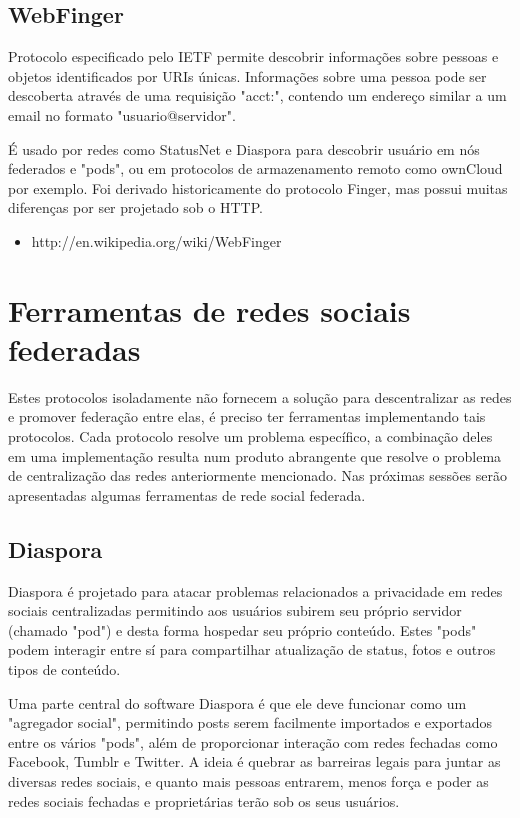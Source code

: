 \documentclass[12pt]{article}
\begin{document}
\subsection{WebFinger}

Protocolo especificado pelo IETF permite descobrir informações sobre pessoas e
objetos identificados por URIs únicas. Informações sobre uma pessoa pode ser
descoberta através de uma requisição "acct:", contendo um endereço similar a
um email no formato "usuario@servidor".

É usado por redes como StatusNet e Diaspora para descobrir usuário em nós
federados e "pods", ou em protocolos de armazenamento remoto como ownCloud por
exemplo. Foi derivado historicamente do protocolo Finger, mas possui muitas
diferenças por ser projetado sob o HTTP.

\begin{itemize}
  \item http://en.wikipedia.org/wiki/WebFinger
\end{itemize}

\section{Ferramentas de redes sociais federadas}

Estes protocolos isoladamente não fornecem a solução para descentralizar as
redes e promover federação entre elas, é preciso ter ferramentas implementando
tais protocolos. Cada protocolo resolve um problema específico, a combinação
deles em uma implementação resulta num produto abrangente que resolve o
problema de centralização das redes anteriormente mencionado. Nas próximas
sessões serão apresentadas algumas ferramentas de rede social federada.

\subsection{Diaspora}

Diaspora é projetado para atacar problemas relacionados a privacidade em redes
sociais centralizadas permitindo aos usuários subirem seu próprio servidor
(chamado "pod") e desta forma hospedar seu próprio conteúdo. Estes "pods" podem
interagir entre sí para compartilhar atualização de status, fotos e outros tipos de
conteúdo.

Uma parte central do software Diaspora é que ele deve funcionar como um
"agregador social", permitindo posts serem facilmente importados e exportados
entre os vários "pods", além de proporcionar interação com redes fechadas como
Facebook, Tumblr e Twitter. A ideia é quebrar as barreiras legais para juntar as
diversas redes sociais, e quanto mais pessoas entrarem, menos força e poder as
redes sociais fechadas e proprietárias terão sob os seus usuários.
\end{document}
